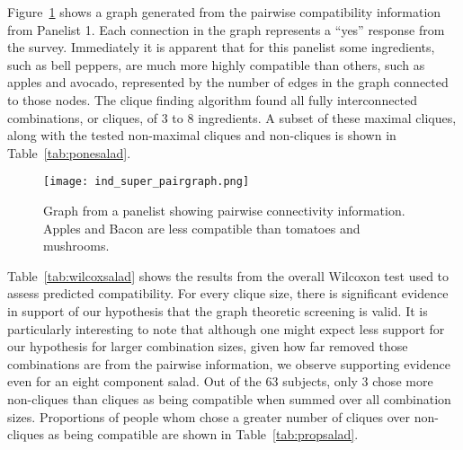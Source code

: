 Figure~\ref{fig:saladgraph} shows a graph generated from the pairwise compatibility information from Panelist 1.  Each connection in the graph represents a “yes” response from the survey.  Immediately it is apparent that for this panelist some ingredients, such as bell peppers, are much more highly compatible than others, such as apples and avocado, represented by the number of edges in the graph connected to those nodes.  The clique finding algorithm found all fully interconnected combinations, or cliques, of 3 to 8 ingredients.  A subset of these maximal cliques, along with the tested non-maximal cliques and non-cliques is shown in Table~\ref{tab:ponesalad}.

\begin{figure}[h!]
\caption[A panelist's salad graph.]{Graph from a panelist showing pairwise connectivity information.  Apples and Bacon are less compatible than tomatoes and mushrooms.}
\centering
\texttt{[image: ind\_super\_pairgraph.png]}
\label{fig:saladgraph}
\end{figure}

Table~\ref{tab:wilcoxsalad} shows the results from the overall Wilcoxon test used to assess predicted compatibility.  For every clique size, there is significant evidence in support of our hypothesis that the graph theoretic screening is valid.  It is particularly interesting to note that although one might expect less support for our hypothesis for larger combination sizes, given how far removed those combinations are from the pairwise information, we observe supporting evidence even for an eight component salad.   Out of the 63 subjects, only 3 chose more non-cliques than cliques as being compatible when summed over all combination sizes.  Proportions of people whom chose a greater number of cliques over non-cliques as being compatible are shown in Table~\ref{tab:propsalad}.

